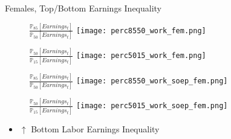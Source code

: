 \documentclass{beamer}
\begin{document}
\begin{frame}{Females, Top/Bottom Earnings Inequality}
\begin{figure}[!t]
\centering
\begin{minipage}[b]{0.32\textwidth}{$\frac{\mathbb{P}_{85}[Earnings_t]}{\mathbb{P}_{50}[Earnings_t]}$}
\centering
\texttt{[image: perc8550\_work\_fem.png]}
\end{minipage}
\begin{minipage}[b]{0.32\textwidth}{$\frac{\mathbb{P}_{50}[Earnings_t]}{\mathbb{P}_{15}[Earnings_t]}$}
\centering
\texttt{[image: perc5015\_work\_fem.png]}
\end{minipage}
\end{figure}
\begin{figure}[!t]
\centering
\begin{minipage}[b]{0.32\textwidth}{$\frac{\mathbb{P}_{85}[Earnings_t]}{\mathbb{P}_{50}[Earnings_t]}$}
\centering
\texttt{[image: perc8550\_work\_soep\_fem.png]}
\end{minipage}
\begin{minipage}[b]{0.32\textwidth}{$\frac{\mathbb{P}_{50}[Earnings_t]}{\mathbb{P}_{15}[Earnings_t]}$}
\centering
\texttt{[image: perc5015\_work\_soep\_fem.png]}
\end{minipage}
\end{figure}
\begin{itemize}
\setlength{\itemsep}{0.7 cm}
\item $\uparrow$ Bottom Labor Earnings Inequality
\end{itemize}
\end{frame}
\end{document}

